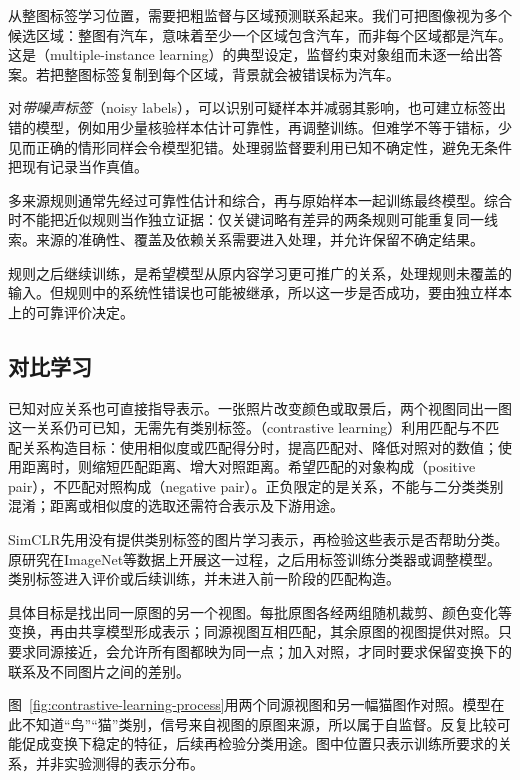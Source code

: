 从整图标签学习位置，需要把粗监督与区域预测联系起来。我们可把图像视为多个候选区域：整图有汽车，意味着至少一个区域包含汽车，而非每个区域都是汽车。这是（multiple-instance learning）的典型设定，监督约束对象组而未逐一给出答案。若把整图标签复制到每个区域，背景就会被错误标为汽车。

对\emph{带噪声标签}（noisy labels），可以识别可疑样本并减弱其影响，也可建立标签出错的模型，例如用少量核验样本估计可靠性，再调整训练。但难学不等于错标，少见而正确的情形同样会令模型犯错。处理弱监督要利用已知不确定性，避免无条件把现有记录当作真值。

多来源规则通常先经过可靠性估计和综合，再与原始样本一起训练最终模型。综合时不能把近似规则当作独立证据：仅关键词略有差异的两条规则可能重复同一线索。来源的准确性、覆盖及依赖关系需要进入处理，并允许保留不确定结果。

规则之后继续训练，是希望模型从原内容学习更可推广的关系，处理规则未覆盖的输入。但规则中的系统性错误也可能被继承，所以这一步是否成功，要由独立样本上的可靠评价决定。

\subsection{对比学习}
\label{sec:contrastive-learning}

已知对应关系也可直接指导表示。一张照片改变颜色或取景后，两个视图同出一图这一关系仍可已知，无需先有类别标签。（contrastive learning）利用匹配与不匹配关系构造目标：使用相似度或匹配得分时，提高匹配对、降低对照对的数值；使用距离时，则缩短匹配距离、增大对照距离。希望匹配的对象构成（positive pair），不匹配对照构成（negative pair）。正负限定的是关系，不能与二分类类别混淆；距离或相似度的选取还需符合表示及下游用途。

SimCLR先用没有提供类别标签的图片学习表示，再检验这些表示是否帮助分类。原研究在ImageNet等数据上开展这一过程，之后用标签训练分类器或调整模型。类别标签进入评价或后续训练，并未进入前一阶段的匹配构造。

具体目标是找出同一原图的另一个视图。每批原图各经两组随机裁剪、颜色变化等变换，再由共享模型形成表示；同源视图互相匹配，其余原图的视图提供对照。只要求同源接近，会允许所有图都映为同一点；加入对照，才同时要求保留变换下的联系及不同图片之间的差别。

图~\ref{fig:contrastive-learning-process}用两个同源视图和另一幅猫图作对照。模型在此不知道“鸟”“猫”类别，信号来自视图的原图来源，所以属于自监督。反复比较可能促成变换下稳定的特征，后续再检验分类用途。图中位置只表示训练所要求的关系，并非实验测得的表示分布。


